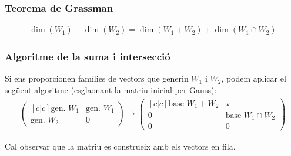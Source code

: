 \subsubsection*{Teorema de Grassman}
\begin{align}
    \dim (W_{1}) + \dim (W_{2}) = \dim (W_{1} + W_{2}) + \dim (W_{1} \cap W_{2})
\end{align}

\subsubsection*{Algoritme de la suma i intersecció}
Si ens proporcionen famílies de vectors que generin $W_{1}$ i $W_{2}$, podem aplicar el següent algoritme (esglaonant la matriu inicial per Gauss):
\begin{align}
    \begin{pmatrix}[c|c]
        \text{gen. } W_{1} & \text{gen. } W_{1} \\ \hline 
        \text{gen. } W_{2} & 0 
    \end{pmatrix} 
    \mapsto 
    \begin{pmatrix}[c|c]
        \text{base } W_{1} + W_{2} & \star \\ \hline 
        0 & \text{base } W_{1} \cap W_{2} \\ \hline 
        0 & 0 
    \end{pmatrix}
\end{align}

Cal observar que la matriu es construeix amb els vectors en fila.